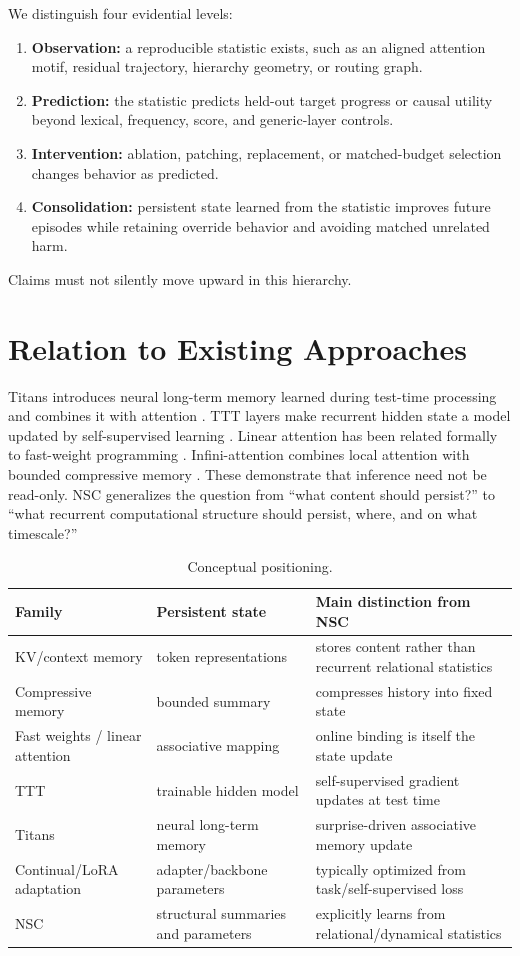 \documentclass[11pt]{article}
\begin{document}
We distinguish four evidential levels:
\begin{enumerate}[leftmargin=*]
\item \textbf{Observation:} a reproducible statistic exists, such as an aligned attention motif, residual trajectory, hierarchy geometry, or routing graph.
\item \textbf{Prediction:} the statistic predicts held-out target progress or causal utility beyond lexical, frequency, score, and generic-layer controls.
\item \textbf{Intervention:} ablation, patching, replacement, or matched-budget selection changes behavior as predicted.
\item \textbf{Consolidation:} persistent state learned from the statistic improves future episodes while retaining override behavior and avoiding matched unrelated harm.
\end{enumerate}
Claims must not silently move upward in this hierarchy.

\section{Relation to Existing Approaches}
Titans introduces neural long-term memory learned during test-time processing and combines it with attention \cite{titans}. TTT layers make recurrent hidden state a model updated by self-supervised learning \cite{ttt}. Linear attention has been related formally to fast-weight programming \cite{fast}. Infini-attention combines local attention with bounded compressive memory \cite{infini}. These demonstrate that inference need not be read-only. NSC generalizes the question from ``what content should persist?'' to ``what recurrent computational structure should persist, where, and on what timescale?''

\begin{table}[h]\centering\small
\begin{tabular}{p{.22\linewidth}p{.27\linewidth}p{.39\linewidth}}\toprule
Family & Persistent state & Main distinction from NSC\\\midrule
KV/context memory & token representations & stores content rather than recurrent relational statistics\\
Compressive memory & bounded summary & compresses history into fixed state\\
Fast weights / linear attention & associative mapping & online binding is itself the state update\\
TTT & trainable hidden model & self-supervised gradient updates at test time\\
Titans & neural long-term memory & surprise-driven associative memory update\\
Continual/LoRA adaptation & adapter/backbone parameters & typically optimized from task/self-supervised loss\\
NSC & structural summaries and parameters & explicitly learns from relational/dynamical statistics\\
\bottomrule\end{tabular}\caption{Conceptual positioning.}
\end{table}
\end{document}
